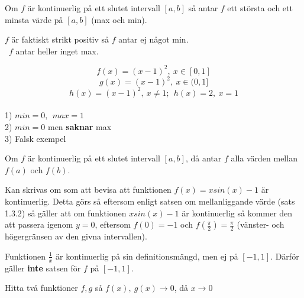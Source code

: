 \documentclass{report}
\begin{document}
\vspace{20pt}
{
	Om $ f $ är kontinuerlig på ett slutet intervall $ [a,b] $ så antar $ f $ ett största och ett minsta värde på $ [a,b] $ (max och min).
}

{
$ f$ är faktiskt strikt positiv så $ f $ antar ej något min.\\\
$ f $ antar heller inget max.
}

{
\begin{equation*}
	f(x) = (x-1)^2,\:x \in [0,1]
\end{equation*}
\begin{equation*}
	g(x) = (x-1)^2,\:x \in (0,1]
\end{equation*}
\begin{equation*}
h(x) = (x-1)^2,\:x \ne 1;\:\:h(x) = 2,\:x = 1 
\end{equation*}
\dotfill\\
1) $ min = 0,\:\:max = 1 $ \\
2) $ min = 0 $ men \textbf{saknar} max\\
3) Falsk exempel\\ 
}

\vspace{20pt}
{
Om $ f $ är kontinuerlig på ett slutet intervall $ [a,b] $, då antar $ f $ alla värden mellan $ f(a) $ och $ f(b) $.
}

\ex{Visa att ekvationen $ xsin(x)-1 = 0 $ har minst en rot på intervallet $ [0, \frac{\pi}{2}  $ }
{
Kan skrivas om som att bevisa att funktionen $ f(x) = xsin(x)-1 $ är kontinuerlig. Detta görs så eftersom enligt satsen om mellanliggande värde (sats 1.3.2) så gäller att om funktionen $ xsin(x)-1 $ är kontinuerlig så kommer den att passera igenom $ y=0 $, eftersom $ f(0) = -1$ och $ f( \frac{\pi}{2} ) = \frac{\pi}{2}  $ (vänster- och högergränsen av den givna intervallen).  
}

{
	Funktionen $ \frac{1}{x}  $ är kontinuerlig på sin definitionsmängd, men ej på $ [-1,1] $. Därför gäller \textbf{inte} satsen för $ f $ på $ [-1,1] $.
}

\vspace{20pt}
\qs{}
{
Hitta två funktioner $ f,g $ så $ f(x),\:g(x) \to 0 $, då $ x \to 0 $
}
\end{document}
